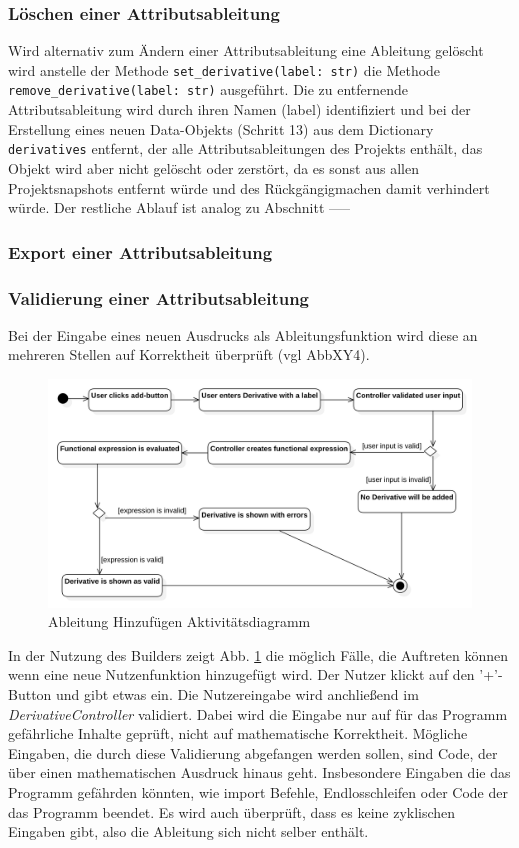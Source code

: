 \documentclass{article}
\begin{document}
\subsubsection{Löschen einer Attributsableitung}
Wird alternativ zum Ändern einer Attributsableitung eine Ableitung gelöscht wird anstelle der Methode \texttt{set\_derivative(label: str)} die Methode \texttt{remove\_derivative(label: str)} ausgeführt. Die zu entfernende Attributsableitung wird durch ihren Namen (label) identifiziert und bei der Erstellung eines neuen Data-Objekts (Schritt 13) aus dem Dictionary \texttt{derivatives} entfernt, der alle Attributsableitungen des Projekts enthält, das Objekt wird aber nicht gelöscht oder zerstört, da es sonst aus allen Projektsnapshots entfernt würde und des Rückgängigmachen damit verhindert würde. Der restliche Ablauf ist analog zu Abschnitt -----

\subsubsection{Export einer Attributsableitung}



\subsubsection{Validierung einer Attributsableitung}

Bei der Eingabe eines neuen Ausdrucks als Ableitungsfunktion wird diese an mehreren Stellen auf Korrektheit überprüft (vgl AbbXY4). 
\begin{figure}[H]%
    \centering
    \includegraphics[width=13cm]{entwurf/Floriane/AktivityAddDerivative.png}
    \caption{Ableitung Hinzufügen Aktivitätsdiagramm}
    \label{fig:ad:AddDerivative}
\end{figure}
In der Nutzung des Builders zeigt Abb. \ref{fig:ad:AddDerivative} die möglich Fälle, die Auftreten können wenn eine neue Nutzenfunktion hinzugefügt wird. Der Nutzer klickt auf den '+'-Button und gibt etwas ein. Die Nutzereingabe wird anchließend im \textit{DerivativeController} validiert. Dabei wird die Eingabe nur auf für das Programm gefährliche Inhalte geprüft, nicht auf mathematische Korrektheit. Mögliche Eingaben, die durch diese Validierung abgefangen werden sollen, sind Code, der über einen mathematischen Ausdruck hinaus geht. Insbesondere Eingaben die das Programm gefährden könnten, wie import Befehle, Endlosschleifen oder Code der das Programm beendet. Es wird auch überprüft, dass es keine zyklischen Eingaben gibt, also die Ableitung sich nicht selber enthält.
\end{document}
